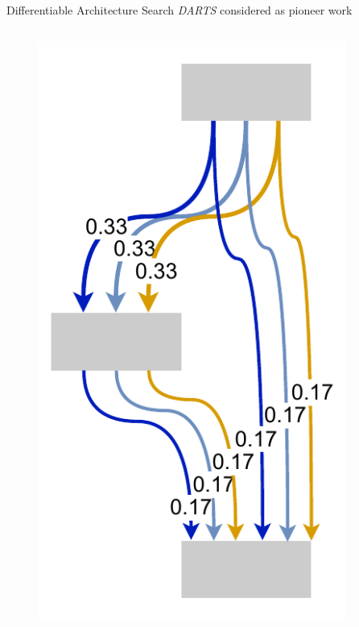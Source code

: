 \documentclass[]{beamer}
\begin{document}
\begin{frame}{Differentiable Architecture Search}
\vspace{10pt}
\textit{DARTS} \cite{Liu2018} considered as pioneer work
\vfill
\begin{columns}
\begin{column}{.35\textwidth}
\begin{figure}
	\includegraphics[scale=0.4, center]{graphics/quick/darts_1.drawio.pdf}
\end{figure}
\end{column}
\begin{column}{.3\textwidth}
\end{column}
\begin{column}{.35\textwidth}
\end{column}
\end{columns}
\end{frame}
\end{document}
